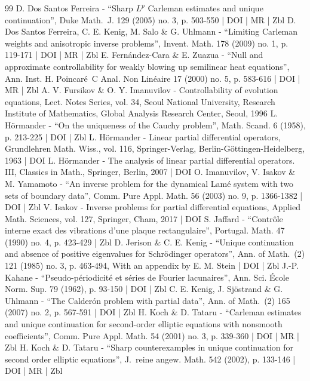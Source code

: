 \begin{thebibliography}{99}
D. Dos Santos Ferreira - “Sharp $L^p$ Carleman estimates and unique continuation”, Duke Math. J. 129 (2005) no. 3, p. 503-550 | DOI | MR | Zbl
D. Dos Santos Ferreira, C. E. Kenig, M. Salo \& G. Uhlmann - “Limiting Carleman weights and anisotropic inverse problems”, Invent. Math. 178 (2009) no. 1, p. 119-171 | DOI | MR | Zbl
E. Fernández-Cara \& E. Zuazua - “Null and approximate controllability for weakly blowing up semilinear heat equations”, Ann. Inst. H. Poincaré C Anal. Non Linéaire 17 (2000) no. 5, p. 583-616 | DOI | MR | Zbl
A. V. Fursikov \& O. Y. Imanuvilov - Controllability of evolution equations, Lect. Notes Series, vol. 34, Seoul National University, Research Institute of Mathematics, Global Analysis Research Center, Seoul, 1996
L. Hörmander - “On the uniqueness of the Cauchy problem”, Math. Scand. 6 (1958), p. 213-225 | DOI | Zbl
L. Hörmander - Linear partial differential operators, Grundlehren Math. Wiss., vol. 116, Springer-Verlag, Berlin-Göttingen-Heidelberg, 1963 | DOI
L. Hörmander - The analysis of linear partial differential operators. III, Classics in Math., Springer, Berlin, 2007 | DOI
O. Imanuvilov, V. Isakov \& M. Yamamoto - “An inverse problem for the dynamical Lamé system with two sets of boundary data”, Comm. Pure Appl. Math. 56 (2003) no. 9, p. 1366-1382 | DOI | Zbl
V. Isakov - Inverse problems for partial differential equations, Applied Math. Sciences, vol. 127, Springer, Cham, 2017 | DOI
S. Jaffard - “Contrôle interne exact des vibrations d’une plaque rectangulaire”, Portugal. Math. 47 (1990) no. 4, p. 423-429 | Zbl
D. Jerison \& C. E. Kenig - “Unique continuation and absence of positive eigenvalues for Schrödinger operators”, Ann. of Math. (2) 121 (1985) no. 3, p. 463-494, With an appendix by E. M. Stein | DOI | Zbl
J.-P. Kahane - “Pseudo-périodicité et séries de Fourier lacunaires”, Ann. Sci. École Norm. Sup. 79 (1962), p. 93-150 | DOI | Zbl
C. E. Kenig, J. Sjöstrand \& G. Uhlmann - “The Calderón problem with partial data”, Ann. of Math. (2) 165 (2007) no. 2, p. 567-591 | DOI | Zbl
H. Koch \& D. Tataru - “Carleman estimates and unique continuation for second-order elliptic equations with nonsmooth coefficients”, Comm. Pure Appl. Math. 54 (2001) no. 3, p. 339-360 | DOI | MR | Zbl
H. Koch \& D. Tataru - “Sharp counterexamples in unique continuation for second order elliptic equations”, J. reine angew. Math. 542 (2002), p. 133-146 | DOI | MR | Zbl

\end{thebibliography}
